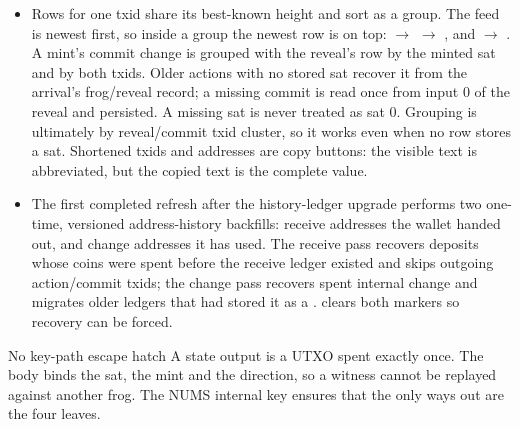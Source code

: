 \begin{itemize}[leftmargin=1.4em,itemsep=0.3em]
        wallet persists a chain-derived mint row, so a restored seed shows
        the same  and  rows without a local
        action ledger. A Hopper received from a peer is not at its mint
        outpoint and does not create a  row.
  \item Rows for one txid share its best-known height and sort as a group.
        The feed is newest first, so inside a group the newest row is on top:
         $\to$  $\to$ , and
         $\to$ . A mint's commit change is grouped
        with the reveal's  row by the minted sat and by
        both txids. Older actions with no stored sat recover it from the
        arrival's frog/reveal record; a missing commit is read once from
        input 0 of the reveal and persisted. A missing sat is never treated
        as sat 0. Grouping is ultimately by reveal/commit txid cluster, so it
        works even when no row stores a sat. Shortened txids and addresses
        are copy buttons: the visible text is abbreviated, but the copied
        text is the complete value.
  \item The first completed refresh after the history-ledger upgrade performs
        two one-time, versioned address-history backfills: receive addresses
        the wallet handed out, and change addresses it has used. The receive
        pass recovers deposits whose coins were spent before the receive
        ledger existed and skips outgoing action/commit txids; the change
        pass recovers spent internal change and migrates older ledgers that
        had stored it as a .  clears both markers
        so recovery can be forced.
\end{itemize}

\begin{invariant}{No key-path escape hatch}
A state output is a UTXO spent exactly once. The body binds the sat, the mint
and the direction, so a witness cannot be replayed against another frog. The
NUMS internal key ensures that the only ways out are the four leaves.
\end{invariant}
